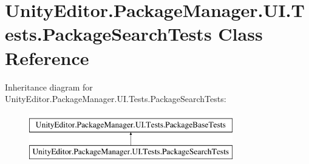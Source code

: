 \hypertarget{class_unity_editor_1_1_package_manager_1_1_u_i_1_1_tests_1_1_package_search_tests}{}\section{Unity\+Editor.\+Package\+Manager.\+U\+I.\+Tests.\+Package\+Search\+Tests Class Reference}
\label{class_unity_editor_1_1_package_manager_1_1_u_i_1_1_tests_1_1_package_search_tests}
Inheritance diagram for Unity\+Editor.\+Package\+Manager.\+U\+I.\+Tests.\+Package\+Search\+Tests\+:\begin{figure}[H]
\begin{center}
\leavevmode
\includegraphics[height=2.000000cm]{class_unity_editor_1_1_package_manager_1_1_u_i_1_1_tests_1_1_package_search_tests}
\end{center}
\end{figure}
